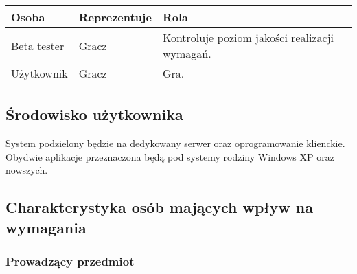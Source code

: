 \documentclass[12pt,a4paper,twoside]{article}
\begin{document}

\begin{longtable}{|p{1in}|p{2in}|p{2in}|}
\hline
{\bf Osoba} & {\bf Reprezentuje} & {\bf Rola}\\
\hline
\endhead
Beta tester &
Gracz &
Kontroluje poziom jakości realizacji wymagań.\\
\hline
Użytkownik &
Gracz &
Gra.\\
\hline
\end{longtable}

\subsection{Środowisko użytkownika}
System podzielony będzie na dedykowany serwer oraz oprogramowanie klienckie.
Obydwie aplikacje przeznaczona będą pod systemy rodziny Windows XP oraz nowszych.








\subsection{Charakterystyka osób mających wpływ na wymagania}


\subsubsection{Prowadzący przedmiot}
\end{document}
